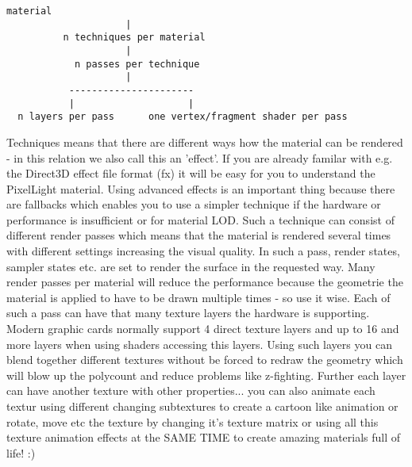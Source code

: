 \begin{lstlisting}[caption=PixelLight material system overview]
                  material
                     |
          n techniques per material
                     |
            n passes per technique
                     |
           ----------------------
           |                    |
  n layers per pass      one vertex/fragment shader per pass
\end{lstlisting}

Techniques means that there are different ways how the material can be rendered - in this relation we 
also call this an 'effect'. If you are already familar with e.g. the Direct3D effect file format (fx) it will be
easy for you to understand the PixelLight material. Using advanced effects is an important thing because there
are fallbacks which enables you to use a simpler technique if the hardware or performance is insufficient or for 
material LOD. Such a technique can consist of different render passes which means that the material is rendered 
several times with different settings increasing the visual quality. In such a pass, render states, sampler states 
etc. are set to render the surface in the requested way.
Many render passes per material will reduce the performance because the geometrie the material
is applied to have to be drawn multiple times - so use it wise. Each of such a pass can have that
many texture layers the hardware is supporting. Modern graphic cards normally support 4 direct texture
layers and up to 16 and more layers when using shaders accessing this layers. Using such layers you can
blend together different textures without be forced to redraw the geometry which will blow up the
polycount and reduce problems like z-fighting. Further each layer can have another texture with other properties... 
you can also animate each textur using different changing subtextures to create a cartoon like animation or rotate, 
move etc the texture by changing it's texture matrix or using all this texture animation effects at the SAME TIME
to create amazing materials full of life! :)\\

